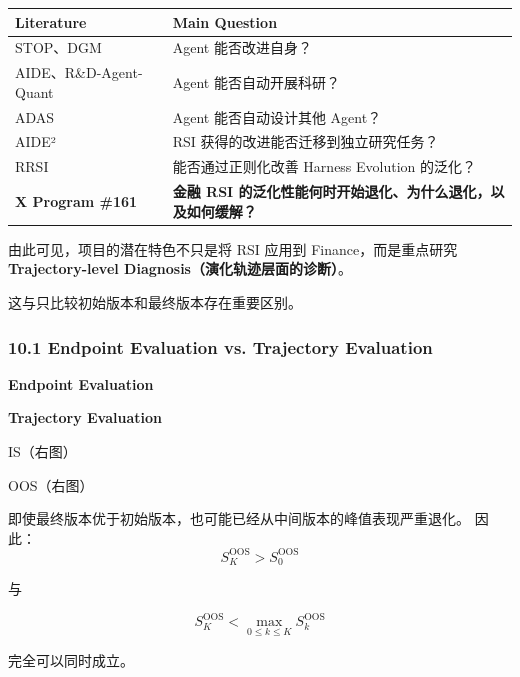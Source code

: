 \begin{readertable}
\begin{longtable}[]{@{}
  >{\raggedright\arraybackslash}p{}
  >{\raggedright\arraybackslash}p{}@{}}
\toprule
Literature & Main Question \\
\midrule
\endhead
STOP、DGM & Agent 能否改进自身？ \\
AIDE、R\&D-Agent-Quant & Agent 能否自动开展科研？ \\
ADAS & Agent 能否自动设计其他 Agent？ \\
AIDE² & RSI 获得的改进能否迁移到独立研究任务？ \\
RRSI & 能否通过正则化改善 Harness Evolution 的泛化？ \\
\textbf{X Program \#161} & \textbf{金融 RSI 的泛化性能何时开始退化、为什么退化，以及如何缓解？} \\
\bottomrule
\end{longtable}
\end{readertable}

由此可见，项目的潜在特色不只是将 RSI 应用到 Finance，而是重点研究 \textbf{Trajectory-level Diagnosis（演化轨迹层面的诊断）}。

这与只比较初始版本和最终版本存在重要区别。

\hypertarget{part-3-44-0001-endpoint-evaluation-vs.-trajectory-evaluation}{%
\subsubsection{10.1 Endpoint Evaluation vs. Trajectory Evaluation}\label{part-3-44-0001-endpoint-evaluation-vs.-trajectory-evaluation}}

\textbf{Endpoint Evaluation}


\textbf{Trajectory Evaluation}


IS（右图）

OOS（右图）

即使最终版本优于初始版本，也可能已经从中间版本的峰值表现严重退化。 因此：
\[S_K^{\mathrm{OOS}}>S_0^{\mathrm{OOS}}\]

与

\[S_K^{\mathrm{OOS}}
<
\max_{0\leq k\leq K}
S_k^{\mathrm{OOS}}\]

完全可以同时成立。

